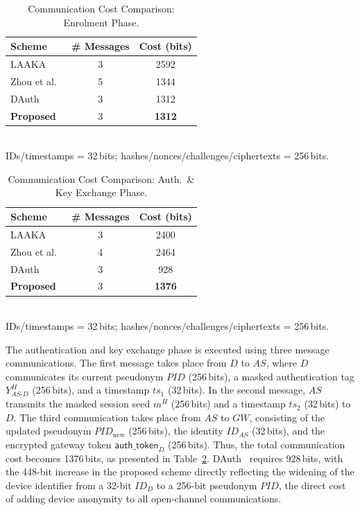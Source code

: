 \documentclass[conference]{IEEEtran}
\makeatletter
\newcommand{\onelinetablecaption}{%
  \long\def\@makecaption##1##2{%
    \footnotesize\bgroup\par\centering\@IEEEtabletopskipstrut
    \setbox\@tempboxa\hbox{%
      \normalfont\footnotesize ##1\quad\scshape ##2}%
    \ifdim\wd\@tempboxa>\hsize
      \parbox{\hsize}{\centering\normalfont\footnotesize ##1\quad\scshape ##2}%
    \else
      \box\@tempboxa
    \fi
    \par
    \addvspace{0.5\baselineskip}\egroup
    \@IEEEtablecaptionsepspace}}
\makeatother
\begin{document}
\begin{table}[!t]
  \centering
  \onelinetablecaption
  \caption{Communication Cost Comparison: Enrolment Phase.}
  \label{tab:comm_enroll}
  \scriptsize
  \setlength{\tabcolsep}{3pt}
  \begin{tabular}{lcc}
    \toprule
    Scheme & \# Messages & Cost (bits) \\
    \midrule
    LAAKA~\cite{ali2024laaka}      & 3 & 2592 \\
    Zhou et al.~\cite{zhou2024auth}      & 5 & 1344 \\
    DAuth~\cite{das2026comsnets}           & 3 & 1312 \\
    \textbf{Proposed}        & 3 & \textbf{1312} \\
    \bottomrule
\end{tabular}\\[3pt]
  \scriptsize
  IDs/timestamps = 32\,bits; hashes/nonces/challenges/ciphertexts = 256\,bits.
\end{table}
\begin{table}[!t]
  \centering
  \onelinetablecaption
  \caption{Communication Cost Comparison: Auth.\ \& Key Exchange Phase.}
  \label{tab:comm_auth}
  \scriptsize
  \setlength{\tabcolsep}{3pt}
  \begin{tabular}{lcc}
    \toprule
    Scheme & \# Messages & Cost (bits) \\
    \midrule
    LAAKA~\cite{ali2024laaka}      & 3 & 2400 \\
    Zhou et al.~\cite{zhou2024auth}      & 4 & 2464 \\
    DAuth~\cite{das2026comsnets}           & 3 & 928 \\
    \textbf{Proposed}        & 3 & \textbf{1376} \\
    \bottomrule
\end{tabular}\\[3pt]
  \scriptsize
  IDs/timestamps = 32\,bits; hashes/nonces/challenges/ciphertexts = 256\,bits.
\end{table}

The authentication and key exchange phase is executed using three message communications.
The first message takes place from $D$ to $AS$, where $D$ communicates its current
pseudonym $\mathit{PID}$ (256\,bits), a masked authentication tag $Y_{AS\text{-}D}^H$
(256\,bits), and a timestamp $ts_1$ (32\,bits). In the second message, $AS$ transmits the
masked session seed $m^H$ (256\,bits) and a timestamp $ts_2$ (32\,bits) to $D$. The
third communication takes place from $AS$ to $GW$, consisting of the updated pseudonym
$\mathit{PID}_{\mathrm{new}}$ (256\,bits), the identity $ID_{AS}$ (32\,bits), and the
encrypted gateway token $\mathsf{auth\_token}_D$ (256\,bits). Thus, the total
communication cost becomes 1376\,bits, as presented in Table~\ref{tab:comm_auth}.
DAuth~\cite{das2026comsnets} requires 928\,bits, with the 448-bit increase in the proposed
scheme directly reflecting the widening of the device identifier from a 32-bit $ID_D$ to
a 256-bit pseudonym $\mathit{PID}$, the direct cost of adding device anonymity to all
open-channel communications.
\end{document}
